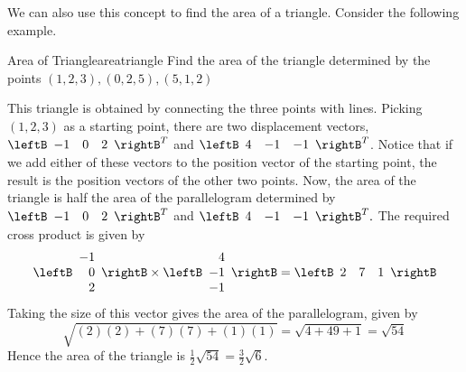 We can also use this concept to find the area of a triangle. Consider the following
example.

\begin{example}{Area of Triangle}{areatriangle}
Find the area of the triangle determined by the points $\left(1, 2, 3 \right) ,
\left( 0,2,5\right),
\left( 5,1, 2 \right) $ 
\end{example}

\begin{solution}
This triangle is obtained by connecting the three points with lines. Picking
$\left( 1,2,3\right) $ as a starting point, there are two displacement
vectors, $\leftB 
\begin{array}{rrr}
-1 & 0 & 2
\end{array}
\rightB^T $ and $\leftB 
\begin{array}{rrr}
4 & -1 & -1
\end{array}
\rightB^T $. Notice that if we add either of these vectors to the position vector of the 
starting point, the result is the position vectors of the other two
points. Now, the area of the triangle is half the area of the parallelogram
determined by $\leftB 
\begin{array}{rrr}
-1 & 0 & 2
\end{array}
\rightB^T $ and $\leftB 
\begin{array}{rrr}
4 & -1 & -1
\end{array}
\rightB^T.$ 
The required cross product is given by
\begin{equation*}
\leftB 
\begin{array}{r}
-1 \\
0 \\
2
\end{array}
\rightB \times \leftB 
\begin{array}{r}
4 \\
-1 \\
-1
\end{array}
\rightB = \leftB
\begin{array}{rrr}
2 & 7 & 1
\end{array}
\rightB 
\end{equation*}
  Taking the size of this vector gives the area of the parallelogram,
given by 
\begin{equation*}
\sqrt{(2)(2) + (7)(7) + (1)(1)}
=
\sqrt{4+49+1}
= \sqrt{54}
\end{equation*}
Hence the area of the triangle is $\frac{1}{2}\sqrt{54}= \frac{3}{2}\sqrt{6}.$
\end{solution}

